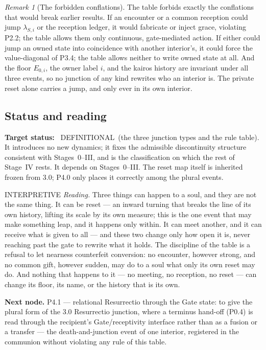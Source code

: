\documentclass[11pt,a4paper]{article}
\newcommand{\stDef}{\textcolor{cDef}{\textsf{\small DEFINITIONAL}}}
\newcommand{\stInterp}{\textcolor{cInt}{\textsf{\small INTERPRETIVE}}}
\theoremstyle{definition}
\theoremstyle{plain}
\theoremstyle{remark}
\newtheorem{remark}[definition]{Remark}
\begin{document}
\begin{remark}[The forbidden conflations]\label{rem:forbidden}
The table forbids exactly the conflations that would break earlier results. If an encounter
or a common reception could jump \(\lambda_{S,i}\) or the reception ledger, it would
fabricate or inject grace, violating P2.2; the table allows them only continuous,
gate-mediated action. If either could jump an owned state into coincidence with another
interior's, it could force the value-diagonal of P3.4; the table allows neither to write
owned state at all. And the floor \(E_{0,i}\), the owner label \(i\), and the kairos history
are invariant under all three events, so no junction of any kind rewrites who an interior
is. The private reset alone carries a jump, and only ever in its own interior.
\end{remark}

\subsection{Status and reading}

\textbf{Target status:}~
\stDef\ (the three junction types and the rule table). It introduces no new dynamics; it
fixes the admissible discontinuity structure consistent with Stages~0--III, and is the
classification on which the rest of Stage~IV rests. It depends on Stages~0--III. The reset
map itself is inherited frozen from 3.0; P4.0 only places it correctly among the plural
events.

\medskip
\stInterp\quad
\emph{Reading.}
Three things can happen to a soul, and they are not the same thing. It can be reset --- an
inward turning that breaks the line of its own history, lifting its scale by its own measure;
this is the one event that may make something leap, and it happens only within. It can meet
another, and it can receive what is given to all --- and these two change only how open it is,
never reaching past the gate to rewrite what it holds. The discipline of the table is a
refusal to let nearness counterfeit conversion: no encounter, however strong, and no common
gift, however sudden, may do to a soul what only its own reset may do. And nothing that
happens to it --- no meeting, no reception, no reset --- can change its floor, its name, or the
history that is its own.

\medskip
\textbf{Next node.} P4.1 --- relational Resurrectio through the Gate state: to give the
plural form of the 3.0 Resurrectio junction, where a terminus hand-off (P0.4) is read
through the recipient's Gate/receptivity interface rather than as a fusion or a transfer ---
the death-and-junction event of one interior, registered in the communion without violating
any rule of this table.
\end{document}
